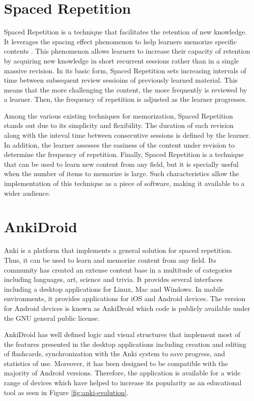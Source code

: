 \section{Spaced Repetition}
Spaced Repetition is a technique that facilitates the retention of new knowledge. It leverages the spacing effect phenomenon to help learners memorize specific contents \citep{hintzman1974theoretical}. This phenomenon allows learners to increase their capacity of retention by acquiring new knowledge in short recurrent sessions rather than in a single massive revision. In its basic form, Spaced Repetition sets increasing intervals of time between subsequent review sessioins of previously learned material. This means that the more challenging the content, the more frequently is reviewed by a learner. Then, the frequency of repetition is adjusted as the learner progresses.

Among the various existing techniques for memorization, Spaced Repetition stands out due to its simplicity and flexibility. The duration of each revision along with the inteval time between consecutive sessions is defined by the learner. In addition, the learner assesses the easiness of the content under revision to determine the frequency of repetition. Finally, Spaced Repetition is a technique that can be used to learn new content from any field, but it is specially useful when the number of items to memorize is large. Such characteristics allow the implementation of this technique as a piece of software, making it available to a wider audience.

\section{AnkiDroid}
Anki is a platform that implements a general solution for spaced repetition. Thus, it can be used to learn and memorize content from any field. Its community has created an extense content base in a multitude of categories including languages, art, science and trivia. It provides several interfaces including a desktop applications for Linux, Mac and Windows. In mobile environments, it provides applications for iOS and Android devices. The version for Android devices is known as AnkiDroid which code is publicly available under the GNU general public license.

AnkiDroid has well defined logic and visual structures that implement most of the features presented in the desktop applications including creation and editing of flashcards, synchronization with the Anki system to save progress, and statistics of use. Moreover, it has been designed to be compatible with the majority of Android versions. Therefore, the application is available for a wide range of devices which have helped to increase its popularity as an educational tool as seen in Figure \ref{fig:anki-evolution}.


